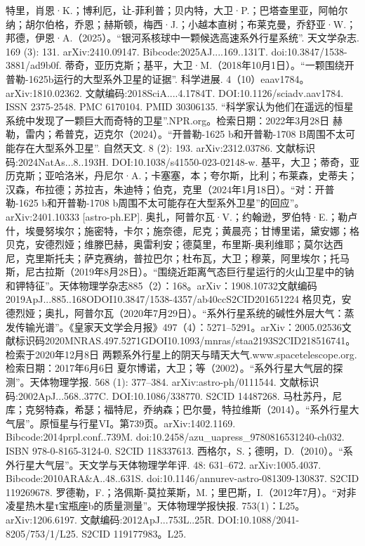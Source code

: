 \begin{enumerate}
 特里，肖恩·K.；博利厄，让-菲利普；贝内特，大卫·P.；巴塔查里亚，阿帕尔纳；胡尔伯格，乔恩；赫斯顿，梅西·J.；小越本直树；布莱克曼，乔舒亚·W.；邦德，伊恩·A.（2025）。“银河系核球中一颗候选高速系外行星系统”. 天文学杂志. 169 (3): 131. arXiv:2410.09147. Bibcode:2025AJ....169..131T. doi:10.3847/1538-3881/ad9b0f.
 蒂奇，亚历克斯；基平，大卫·M.（2018年10月1日）。“一颗围绕开普勒-1625b运行的大型系外卫星的证据”. 科学进展. 4（10）eaav1784。arXiv:1810.02362. 文献编码:2018SciA....4.1784T. DOI:10.1126/sciadv.aav1784. ISSN 2375-2548. PMC 6170104. PMID 30306135.
 “科学家认为他们在遥远的恒星系统中发现了一颗巨大而奇特的卫星”.NPR.org。检索日期：2022年3月28日
 赫勒，雷内；希普克，迈克尔（2024）。“开普勒-1625 b和开普勒-1708 B周围不太可能存在大型系外卫星”. 自然天文. 8 (2): 193. arXiv:2312.03786. 文献标识码:2024NatAs...8..193H. DOI:10.1038/s41550-023-02148-w.
 基平，大卫；蒂奇，亚历克斯；亚哈洛米，丹尼尔·A.；卡塞塞，本；夸尔斯，比利；布莱森，史蒂夫；汉森，布拉德；苏拉吉，朱迪特；伯克，克里（2024年1月18日）。“对：开普勒-1625 b和开普勒-1708 b周围不太可能存在大型系外卫星”的回应”。arXiv:2401.10333 [astro-ph.EP].
 奥扎，阿普尔瓦·V.；约翰逊，罗伯特·E.；勒卢什，埃曼努埃尔；施密特，卡尔；施奈德，尼克；黄晨亮；甘博里诺，黛安娜；格贝克，安德烈娅；维滕巴赫，奥雷利安；德莫里，布里斯-奥利维耶；莫尔达西尼，克里斯托夫；萨克赛纳，普拉巴尔；杜布瓦，大卫；穆莱，阿里埃尔；托马斯，尼古拉斯（2019年8月28日）。“围绕近距离气态巨行星运行的火山卫星中的钠和钾特征”。天体物理学杂志885（2）：168。arXiv：1908.10732文献编码2019ApJ...885..168ODOI10.3847/1538-4357/ab40ccS2CID201651224
 格贝克，安德烈娅；奥扎，阿普尔瓦（2020年7月29日）。“系外行星系统的碱性外层大气：蒸发传输光谱”。《皇家天文学会月报》497（4）：5271–5291。arXiv：2005.02536文献标识码2020MNRAS.497.5271GDOI10.1093/mnras/staa2193S2CID218516741。检索于2020年12月8日
 两颗系外行星上的阴天与晴天大气.www.spacetelescope.org. 检索日期：2017年6月6日
 夏尔博诺，大卫；等（2002）。“系外行星大气层的探测”。天体物理学报. 568 (1): 377–384. arXiv:astro-ph/0111544. 文献标识码:2002ApJ...568..377C. DOI:10.1086/338770. S2CID 14487268.
 马杜苏丹，尼库；克努特森，希瑟；福特尼，乔纳森；巴尔曼，特拉维斯（2014）。“系外行星大气层”。原恒星与行星VI。第739页。arXiv:1402.1169. Bibcode:2014prpl.conf..739M. doi:10.2458/azu_uapress_9780816531240-ch032. ISBN 978-0-8165-3124-0. S2CID 118337613.
 西格尔，S.；德明，D.（2010）。“系外行星大气层”。天文学与天体物理学年评. 48: 631–672. arXiv:1005.4037. Bibcode:2010ARA&A..48..631S. doi:10.1146/annurev-astro-081309-130837. S2CID 119269678.
 罗德勒，F.；洛佩斯-莫拉莱斯，M.；里巴斯，I.（2012年7月）。“对非凌星热木星τ宝瓶座b的质量测量”。天体物理学报快报. 753(1)：L25。arXiv:1206.6197. 文献编码:2012ApJ...753L..25R. DOI:10.1088/2041-8205/753/1/L25. S2CID 119177983。L25.

\end{enumerate}
